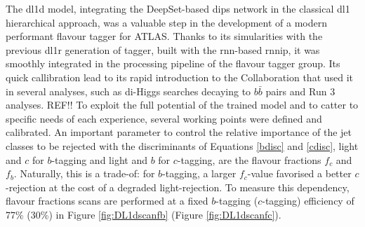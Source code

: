 The \gls{dl1d} model, integrating the DeepSet-based \gls{dips} network in the classical \gls{dl1} hierarchical approach, was a valuable step in the development of a modern performant flavour tagger for ATLAS. Thanks to its simularities with the previous \gls{dl1r} generation of tagger, built with the \gls{rnn}-based \gls{rnnip}, it was smoothly integrated in the processing pipeline of the flavour tagger group. Its quick callibration lead to its rapid introduction to the Collaboration that used it in several analyses, such as di-Higgs searches decaying to $b\bar{b}$ pairs and Run 3 analyses. REF!! To exploit the full potential of the trained model and to catter to specific needs of each experience, several working points were defined and calibrated. An important parameter to control the relative importance of the jet classes to be rejected with the discriminants of Equations \ref{bdisc} and \ref{cdisc}, light and $c$ for $b$-tagging and light and $b$ for $c$-tagging, are the flavour fractions $f_c$ and $f_b$. Naturally, this is a trade-of: for $b$-tagging, a larger $f_c$-value favorised a better $c$-rejection at the cost of a degraded light-rejection. To measure this dependency, flavour fractions scans are performed at a fixed $b$-tagging ($c$-tagging) efficiency of 77\% (30\%) in Figure \ref{fig:DL1dscanfb} (Figure \ref{fig:DL1dscanfc}). 

